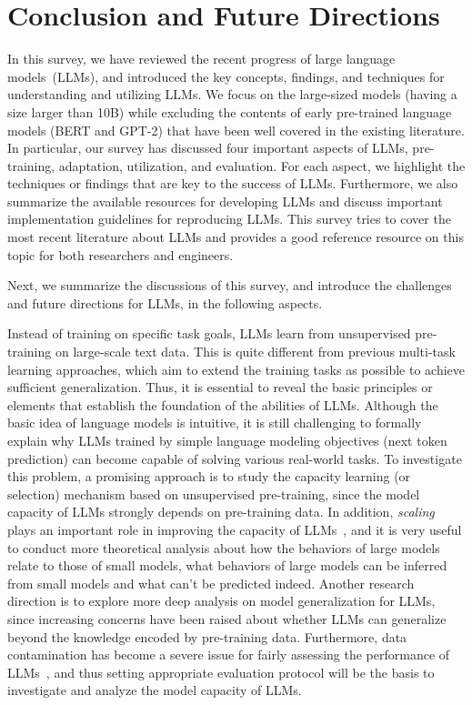 \section{Conclusion and Future Directions}
\label{sec-con}
In this survey, we have reviewed the recent progress of large language models~(LLMs), and introduced the key concepts, findings, and techniques for understanding and utilizing LLMs. We focus on the large-sized models (\ie having a size larger than 10B) while excluding the contents of early pre-trained language models (\eg BERT and GPT-2) that  have been well covered in the existing literature.  
In particular, our survey has discussed four important aspects of LLMs, \ie pre-training, adaptation, utilization, and evaluation. For each aspect, we highlight the techniques or findings that are key to the success of LLMs.
Furthermore, we also summarize the available resources for developing LLMs and discuss important implementation guidelines for reproducing LLMs. 
This survey tries to cover the most recent literature about LLMs and provides a good reference resource on this topic for both researchers and engineers.
      
Next, we summarize the discussions of this survey, and introduce the challenges and future directions for LLMs, in the following aspects. 

Instead of training on specific task goals, LLMs learn from unsupervised pre-training on large-scale text data. This is quite different from previous multi-task learning approaches, which aim to extend the training tasks as possible to achieve sufficient generalization.  
Thus, it is essential to reveal the basic principles  or elements that establish the foundation of the abilities of LLMs.  
Although the basic idea of language models is intuitive, it is still challenging to formally explain why LLMs trained by  simple language modeling objectives (\eg next token prediction) can become capable of solving various real-world tasks. 
To investigate this problem, a promising approach is to study the  
capacity learning (or selection) mechanism based on unsupervised pre-training, since 
  the model capacity of LLMs strongly depends on  pre-training data.  
In addition, \emph{scaling}   plays an important role in improving the capacity of LLMs~\cite{Brown-NeurIPS-2020-Language,Wei-arxiv-2022-Emergent,Rae-arxiv-2021-Scaling}, and it is very useful to conduct more theoretical analysis about how the behaviors of large models relate to those of small models, \eg what behaviors of large models can be inferred from small models and what can't be predicted  indeed.  
Another research direction is to explore more deep analysis on model generalization for LLMs, since increasing concerns have been raised about whether LLMs can generalize beyond the knowledge encoded by pre-training data. Furthermore,
data contamination has become a severe issue for fairly assessing the performance of LLMs~\cite{zhou-arxiv-2023-dont}, and thus 
setting appropriate evaluation protocol will be the basis to investigate and analyze the model capacity of LLMs. 






